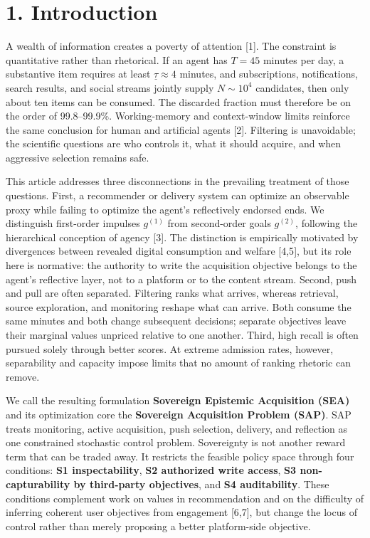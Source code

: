 \documentclass[
  11pt]{article}
\begin{document}
\section{1. Introduction}\label{introduction}

A wealth of information creates a poverty of attention {[}1{]}. The constraint is quantitative rather than rhetorical. If an agent has \(T=45\) minutes per day, a substantive item requires at least \(\underline\tau\approx4\) minutes, and subscriptions, notifications, search results, and social streams jointly supply \(N\sim10^4\) candidates, then only about ten items can be consumed. The discarded fraction must therefore be on the order of 99.8--99.9\%. Working-memory and context-window limits reinforce the same conclusion for human and artificial agents {[}2{]}. Filtering is unavoidable; the scientific questions are who controls it, what it should acquire, and when aggressive selection remains safe.

This article addresses three disconnections in the prevailing treatment of those questions. First, a recommender or delivery system can optimize an observable proxy while failing to optimize the agent's reflectively endorsed ends. We distinguish first-order impulses \(g^{(1)}\) from second-order goals \(g^{(2)}\), following the hierarchical conception of agency {[}3{]}. The distinction is empirically motivated by divergences between revealed digital consumption and welfare {[}4,5{]}, but its role here is normative: the authority to write the acquisition objective belongs to the agent's reflective layer, not to a platform or to the content stream. Second, push and pull are often separated. Filtering ranks what arrives, whereas retrieval, source exploration, and monitoring reshape what can arrive. Both consume the same minutes and both change subsequent decisions; separate objectives leave their marginal values unpriced relative to one another. Third, high recall is often pursued solely through better scores. At extreme admission rates, however, separability and capacity impose limits that no amount of ranking rhetoric can remove.

We call the resulting formulation \textbf{Sovereign Epistemic Acquisition (SEA)} and its optimization core the \textbf{Sovereign Acquisition Problem (SAP)}. SAP treats monitoring, active acquisition, push selection, delivery, and reflection as one constrained stochastic control problem. Sovereignty is not another reward term that can be traded away. It restricts the feasible policy space through four conditions: \textbf{S1 inspectability}, \textbf{S2 authorized write access}, \textbf{S3 non-capturability by third-party objectives}, and \textbf{S4 auditability}. These conditions complement work on values in recommendation and on the difficulty of inferring coherent user objectives from engagement {[}6,7{]}, but change the locus of control rather than merely proposing a better platform-side objective.
\end{document}
